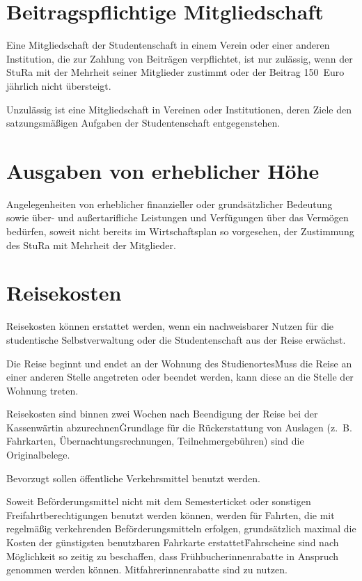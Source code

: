 {\begin{multicols}{2}
\section{Beitragspflichtige Mitgliedschaft}

\Abs \Satz Eine Mitgliedschaft der Studentenschaft in einem Verein oder einer anderen Institution, die zur Zahlung von Beiträgen verpflichtet, ist nur zulässig, wenn der StuRa mit der Mehrheit seiner Mitglieder zustimmt oder der Beitrag 150~Euro jährlich nicht übersteigt.

\Abs \Satz Unzulässig ist eine Mitgliedschaft in Vereinen oder Institutionen, deren Ziele den satzungsmäßigen Aufgaben der Studentenschaft entgegenstehen.



\section{Ausgaben von erheblicher Höhe}

\Abs \Satz Angelegenheiten von erheblicher finanzieller oder grundsätzlicher Bedeutung sowie über- und außertarifliche Leistungen und Verfügungen über das Vermögen bedürfen, soweit nicht bereits im Wirtschaftsplan so vorgesehen, der Zustimmung des StuRa mit Mehrheit der Mitglieder.



\section{Reisekosten}

\Abs \Satz Reisekosten können erstattet werden, wenn ein nachweisbarer Nutzen für die studentische Selbstverwaltung oder die Studentenschaft aus der Reise erwächst.

\Abs \Satz Die Reise beginnt und endet an der Wohnung des Studienortes\. Muss die Reise an einer anderen Stelle angetreten oder beendet werden, kann diese an die Stelle der Wohnung treten.

\Abs \Satz Reisekosten sind binnen zwei Wochen nach Beendigung der Reise bei der Kassenwärtin abzurechnen\. Grundlage für die Rückerstattung von Auslagen (z.~B. Fahrkarten, Übernachtungsrechnungen, Teilnehmergebühren) sind die Originalbelege.

\Abs \Satz Bevorzugt sollen öffentliche Verkehrsmittel benutzt werden.

\Abs \Satz Soweit Beförderungsmittel nicht mit dem Semesterticket oder sonstigen Freifahrtberechtigungen benutzt werden können, werden für Fahrten, die mit regelmäßig verkehrenden Beförderungsmitteln erfolgen, grundsätzlich maximal die Kosten der günstigsten benutzbaren Fahrkarte erstattet\. Fahrscheine sind nach Möglichkeit so zeitig zu beschaffen, dass Frühbucherinnenrabatte in Anspruch genommen werden können. Mitfahrerinnenrabatte sind zu nutzen.


\end{multicols}}

